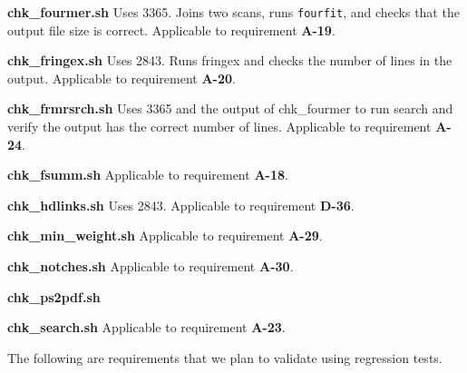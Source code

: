 \begin{description}
\item{\textbf{chk\_fourmer.sh}} Uses 3365. Joins two scans, runs \texttt{fourfit}, and checks that the output file size is correct. Applicable to requirement \textbf{A-19}.
\item{\textbf{chk\_fringex.sh}} Uses 2843. Runs fringex and checks the number of lines in the output. Applicable to requirement \textbf{A-20}.
\item{\textbf{chk\_frmrsrch.sh}} Uses 3365 and the output of chk\_fourmer to run search and verify the output has the correct number of lines. Applicable to requirement \textbf{A-24}.
\item{\textbf{chk\_fsumm.sh}} Applicable to requirement \textbf{A-18}.
\item{\textbf{chk\_hdlinks.sh}} Uses 2843. Applicable to requirement \textbf{D-36}.
\item{\textbf{chk\_min\_weight.sh}} Applicable to requirement \textbf{A-29}.
\item{\textbf{chk\_notches.sh}} Applicable to requirement \textbf{A-30}.
\item{\textbf{chk\_ps2pdf.sh}}
\item{\textbf{chk\_search.sh}} Applicable to requirement \textbf{A-23}.
  
\end{description}


The following are requirements that we plan to validate using regression tests. 

